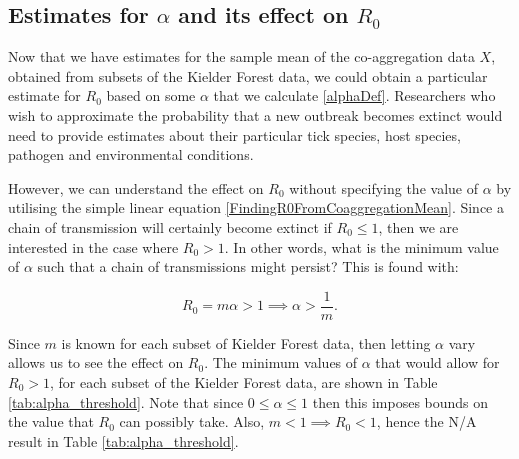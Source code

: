 \documentclass[hidelinks]{article}
\begin{document}
\clearpage

\subsection{Estimates for \texorpdfstring{$ \alpha $}{alpha} and its effect on \texorpdfstring{$ R_0 $}{R0}}

Now that we have estimates for the sample mean of the co-aggregation data $ X $, obtained from subsets of the Kielder Forest data, we could obtain a particular estimate for $ R_0 $ based on some $ \alpha $ that we calculate \eqref{alphaDef}. Researchers who wish to approximate the probability that a new outbreak becomes extinct would need to provide estimates about their particular tick species, host species, pathogen and environmental conditions.

However, we can understand the effect on $ R_0 $ without specifying the value of $ \alpha $ by utilising the simple linear equation \eqref{FindingR0FromCoaggregationMean}. Since a chain of transmission will certainly become extinct if $ R_0 \le 1 $, then we are interested in the case where $ R_0 > 1 $. In other words, what is the minimum value of $ \alpha $ such that a chain of transmissions might persist? This is found with:

\begin{equation}
	R_0 = m\alpha > 1 \implies \alpha > \frac{1}{m} \nonumber.
\end{equation}

Since $ m $ is known for each subset of Kielder Forest data, then letting $ \alpha $ vary allows us to see the effect on $ R_0 $. The minimum values of $ \alpha $ that would allow for $ R_0 > 1 $, for each subset of the Kielder Forest data, are shown in Table \ref{tab:alpha_threshold}. Note that since $ 0 \le \alpha \le 1 $ then this imposes bounds on the value that $ R_0 $ can possibly take. Also, $ m < 1 \implies R_0 < 1 $, hence the N/A result in Table \ref{tab:alpha_threshold}.
\end{document}

